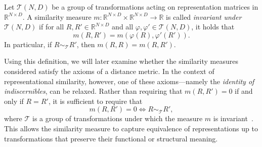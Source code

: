 \begin{definition}
Let $\mathcal{T}(N, D)$ be a group of transformations acting on representation matrices in $\mathbb{R}^{N \times D}$.  
A similarity measure \( m: \mathbb{R}^{N \times D} \times \mathbb{R}^{N \times D} \to \mathbb{R} \) is called \emph{invariant under} \( \mathcal{T}(N, D) \) if for all \( R, R' \in \mathbb{R}^{N \times D} \) and all \( \varphi, \varphi' \in \mathcal{T}(N, D) \), it holds that
\[
    m(R, R') = m(\varphi(R), \varphi'(R')).
\]
In particular, if \( R \sim_{\mathcal{T}} R' \), then \( m(R, R) = m(R, R') \).
\end{definition}

Using this definition, we will later examine whether the similarity measures considered satisfy the axioms of a distance metric.  
In the context of representational similarity, however, one of these axioms—namely the \emph{identity of indiscernibles}, can be relaxed.  
Rather than requiring that \( m(R, R') = 0 \) if and only if \( R = R' \), it is sufficient to require that
\[
m(R, R') = 0 \iff R \sim_{\mathcal{T}} R',
\]
where \( \mathcal{T} \) is a group of transformations under which the measure \( m \) is invariant~\cite{williams_generalized_2021}.  
This allows the similarity measure to capture equivalence of representations up to transformations that preserve their functional or structural meaning.







